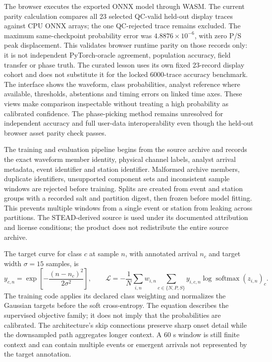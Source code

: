 The browser executes the exported ONNX model through WASM. The current
parity calculation compares all 23 selected QC-valid held-out display traces
against CPU ONNX arrays; the one QC-rejected trace remains excluded. The
maximum same-checkpoint probability error was \(4.8876\times10^{-6}\),
with zero P/S peak displacement. This validates browser runtime parity
on those records only: it is not independent PyTorch-oracle agreement,
population accuracy, field transfer or phase truth. The curated lesson
uses its own fixed 23-record display cohort and does not substitute it
for the locked 6000-trace accuracy benchmark. The interface shows the
waveform, class probabilities, analyst reference where available,
thresholds, abstentions and timing errors on linked time axes. These
views make comparison inspectable without treating a high probability
as calibrated confidence. The phase-picking method remains unresolved for independent
accuracy and full user-data interoperability even though the held-out
browser asset parity check passes.

The training and evaluation pipeline begins from the source archive and
records the exact waveform member identity, physical channel labels,
analyst arrival metadata, event identifier and station identifier.
Malformed archive members, duplicate identifiers, unsupported component
sets and inconsistent sample windows are rejected before training.
Splits are created from event and station groups with a recorded salt and
partition digest, then frozen before model fitting. This prevents
multiple windows from a single event or station from leaking across
partitions. The STEAD-derived source is used under its documented
attribution and license conditions; the product does not redistribute
the entire source archive.

The target curve for class \(c\) at sample \(n\), with annotated arrival
\(n_c\) and target width \(\sigma=15\) samples, is
\begin{equation}\label{eq:phase-target}
 y_{c,n}=\exp\left[-\frac{(n-n_c)^2}{2\sigma^2}\right],\qquad
 \mathcal{L}=-\frac{1}{N}\sum_{i,n}w_{i,n}
 \sum_{c\in\{N,P,S\}}y_{i,c,n}
 \log \operatorname{softmax}(z_{i,n})_c .
\end{equation}
The training code applies its declared class weighting and normalizes
the Gaussian targets before the soft cross-entropy. The equation
describes the supervised objective family; it does not imply that the
probabilities are calibrated. The architecture's skip connections
preserve sharp onset detail while the downsampled path aggregates
longer context. A 60 s window is still finite context and can contain
multiple events or emergent arrivals not represented by the target
annotation.

